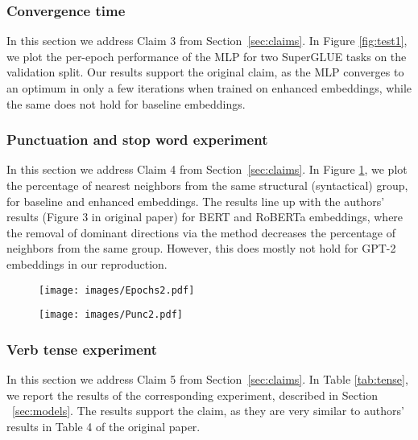 \subsubsection{Convergence time}
In this section we address Claim 3 from Section~\ref{sec:claims}. In Figure \ref{fig:test1}, we plot the per-epoch performance of the MLP for two SuperGLUE tasks on the validation split. Our results support the original claim, as the MLP converges to an optimum in only a few iterations when trained on enhanced embeddings, while the same does not hold for baseline embeddings.

\subsubsection{Punctuation and stop word experiment}
In this section we address Claim 4 from Section~\ref{sec:claims}. In Figure \ref{fig:test2}, we plot the percentage of nearest neighbors from the same structural (syntactical) group, for baseline and enhanced embeddings. The results line up with the authors' results (Figure 3 in original paper) for BERT and RoBERTa embeddings, where the removal of dominant directions via the method decreases the percentage of neighbors from the same group. However, this does mostly not hold for GPT-2 embeddings in our reproduction. 

\begin{figure}[h]
\centering
\begin{minipage}{.36\textwidth}
  \centering
  \texttt{[image: images/Epochs2.pdf]}
  \label{fig:test1}
\end{minipage}
\hspace{0.01\textwidth}
\begin{minipage}{.61\textwidth}
  \centering
  \texttt{[image: images/Punc2.pdf]}
  \label{fig:test2}
\end{minipage}
\end{figure}



\subsubsection{Verb tense experiment}
In this section we address Claim 5 from Section~\ref{sec:claims}. In Table \ref{tab:tense}, we report the results of the corresponding experiment, described in Section ~\ref{sec:models}. The results support the claim, as they are very similar to authors' results in Table 4 of the original paper.

